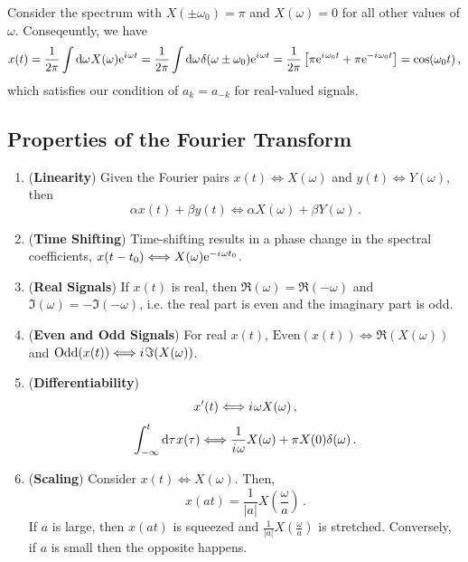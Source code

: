 \begin{exmp}
  Consider the spectrum with $X(\pm\omega_0) = \pi$ and $X(\omega) = 0$
  for all other values of $\omega$. Conseqeuntly, we have
  \begin{displaymath}
    x(t) = \frac{1}{2\pi}\int\mathrm{d}\omega\mkern1muX(\omega)\mathrm{e}^{{i\mkern1mu}\omega t}
    = \frac{1}{2\pi} \int\mathrm{d}\omega\mkern1mu\delta(\omega\pm\omega_0)\mathrm{e}^{{i\mkern1mu}\omega t}
    = \frac{1}{2\pi}\left[\pi\mathrm{e}^{{i\mkern1mu}\omega_0 t} + \pi\mathrm{e}^{-{i\mkern1mu}\omega_0 t}\right]
    = \cos(\omega_0 t) \,,
  \end{displaymath}
  which satisfies our condition of $a_k = a_{-k}$ for real-valued signals.
\end{exmp}

\subsection{Properties of the Fourier Transform}
%
\begin{enumerate}
\item (\textbf{Linearity}) Given the Fourier pairs $x(t) \Longleftrightarrow X(\omega)$ and
  $y(t) \Longleftrightarrow Y(\omega)$, then
  \begin{displaymath}
    \alpha x(t) + \beta y(t) \Longleftrightarrow \alpha X(\omega) + \beta Y(\omega) \,.
  \end{displaymath}
\item (\textbf{Time Shifting}) Time-shifting results in a phase change in the
  spectral coefficients, $x(t-t_0) \Longleftrightarrow X(\omega)\mathrm{e}^{-{i\mkern1mu}\omega t_0}$.
\item (\textbf{Real Signals}) If $x(t)$ is real, then $\Re(\omega) = \Re(-\omega)$
  and $\Im(\omega) = -\Im(-\omega)$, i.e. the real part is even and the imaginary
  part is odd.
\item (\textbf{Even and Odd Signals}) For real $x(t)$,
  $\mathrm{Even}(x(t)) \Longleftrightarrow \Re(X(\omega))$ and
  $\mathrm{Odd}(x(t)) \Longleftrightarrow {i\mkern1mu}\Im(X(\omega))$.
\item (\textbf{Differentiability})
  \begin{displaymath}
    x^\prime(t) \Longleftrightarrow {i\mkern1mu}\omega X(\omega) \,,
  \end{displaymath}
  \begin{displaymath}
    \int_{-\infty}^t \mathrm{d}\tau\mkern1mux(\tau) \Longleftrightarrow \frac{1}{{i\mkern1mu}\omega}X(\omega) + \pi X(0)\delta(\omega) \,.
  \end{displaymath}
\item (\textbf{Scaling}) Consider $x(t) \Longleftrightarrow X(\omega)$. Then,
  \begin{displaymath}
    x(at) = \frac{1}{|a|} X\left(\frac{\omega}{a}\right) \,.
  \end{displaymath}
  If $a$ is large, then $x(at)$ is squeezed and $\frac{1}{|a|} X\left(\frac{\omega}{a}\right)$
  is stretched. Conversely, if $a$ is small then the opposite happens.
\end{enumerate}

